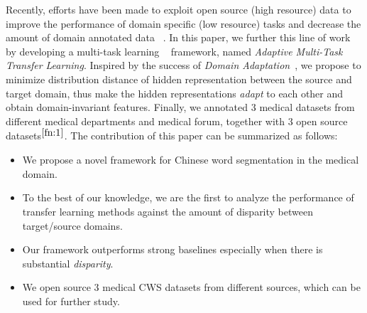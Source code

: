 Recently, efforts have been made to exploit open source (high resource) data to improve the performance of domain specific (low resource) tasks and decrease the amount of domain annotated data ~\cite{DBLP:journals/corr/YangSC17,DBLP:journals/corr/PengD16a,DBLP:journals/corr/MouMYLXZJ16}.
In this paper, we further this line of work by developing a multi-task 
learning ~\cite{Caruana1997,DBLP:journals/corr/PengD16a} framework, 
named \textit{Adaptive Multi-Task Transfer Learning}. 
Inspired by the success of \textit{Domain Adaptation}~\cite{Saenko:2010:AVC:1888089.1888106,DBLP:journals/corr/TzengHZSD14,DBLP:journals/corr/Long015}, 
we propose to minimize distribution distance of hidden representation 
between the source and target domain, thus make the hidden 
representations \textit{adapt} to each other and obtain domain-invariant 
features. Finally, we annotated 3 medical datasets from different medical 
departments and medical forum, together with 3 open source 
datasets$^{\ref{fn:1}}$. 
The contribution of this paper can be summarized as follows:

\begin{itemize}
\item We propose a novel framework for Chinese word segmentation in the medical
domain.
\item To the best of our knowledge, we are the first to analyze the performance of transfer learning methods against the amount of disparity between 
target/source domains.
\item Our framework outperforms strong baselines especially when there is substantial \textit{disparity}. 
\item We open source 3 medical CWS datasets from different sources, which can be used for further study.
\end{itemize}
